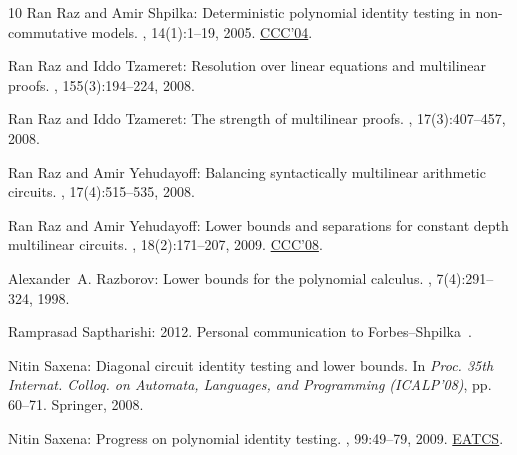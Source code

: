 \documentclass[11pt]{article}
\numberwithin{equation}{section}
\theoremstyle{definition}
\theoremstyle{plain}
\begin{document}
\begin{thebibliography}{10}
{\sc Ran Raz and Amir Shpilka}: Deterministic polynomial identity testing in
  non-commutative models.
, 14(1):1--19, 2005.
\newblock \prelim \href{https://doi.org/10.1109/CCC.2004.1313845}{CCC'04}.
\newblock [\epfmtdoi{10.1007/s00037-005-0188-8}]

{\sc Ran Raz and Iddo Tzameret}: Resolution over linear equations and
  multilinear proofs.
, 155(3):194--224, 2008.

{\sc Ran Raz and Iddo Tzameret}: The strength of multilinear proofs.
, 17(3):407--457, 2008.

{\sc Ran Raz and Amir Yehudayoff}: Balancing syntactically multilinear
  arithmetic circuits.
, 17(4):515--535, 2008.
\newblock [\epfmtdoi{10.1007/s00037-008-0254-0}]

{\sc Ran Raz and Amir Yehudayoff}: Lower bounds and separations for constant
  depth multilinear circuits.
, 18(2):171--207, 2009.
\newblock \prelim \href{https://doi.org/10.1109/CCC.2008.8}{CCC'08}.

{\sc Alexander~A. Razborov}: Lower bounds for the polynomial calculus.
, 7(4):291--324, 1998.
\newblock [\epfmtdoi{10.1007/s000370050013}]

{\sc Ramprasad Saptharishi}: 2012.
\newblock Personal communication to Forbes--Shpilka~\cite{ForbesShpilka13b}.

{\sc Nitin Saxena}: Diagonal circuit identity testing and lower bounds.
\newblock In {\em Proc. 35th Internat. Colloq. on Automata, Languages, and
  Programming (ICALP'08)}, pp. 60--71. Springer, 2008.

{\sc Nitin Saxena}: Progress on polynomial identity testing.
, 99:49--79, 2009.
\newblock \href{https://eatcs.org/images/bulletin/beatcs99.pdf}{EATCS}.


\end{thebibliography}
\end{document}

